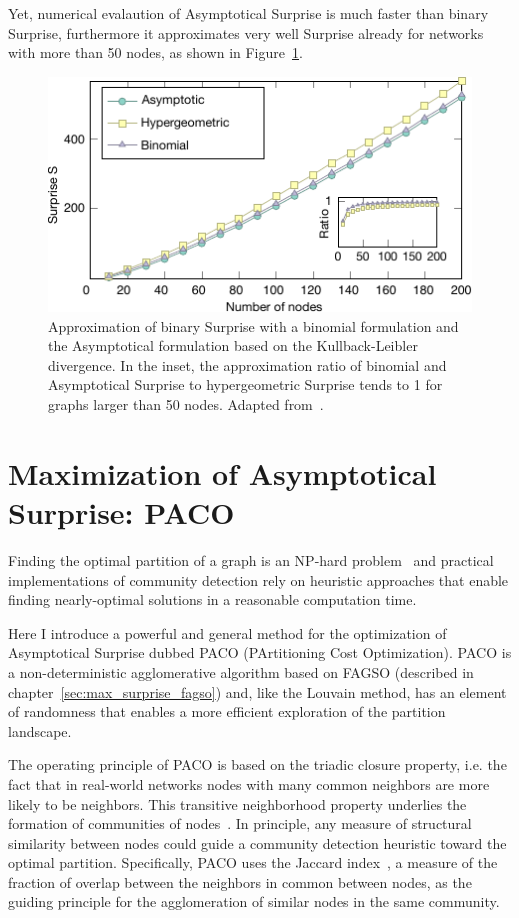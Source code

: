 Yet, numerical evalaution of Asymptotical Surprise is much faster than binary Surprise, furthermore it approximates very well Surprise already for networks with more than 50 nodes, as shown in Figure~\ref{fig:asymptotical_surprise_comparison}.

\begin{figure}[htb!]
\centering
\includegraphics[width=1\textwidth]{images/asymptotical_surprise_comparison.pdf}
\caption{Approximation of binary Surprise with a binomial formulation and the Asymptotical formulation based on the Kullback-Leibler divergence. In the inset, the approximation ratio of binomial and Asymptotical Surprise to hypergeometric Surprise tends to 1 for graphs larger than 50 nodes. Adapted from~\cite{traag2015}.}
\label{fig:asymptotical_surprise_comparison}
\end{figure}

\section{Maximization of Asymptotical Surprise: PACO}
Finding the optimal partition of a graph is an NP-hard problem~\cite{fortunato2010} and practical implementations of community detection rely on heuristic approaches that enable finding nearly-optimal solutions in a reasonable computation time.

Here I introduce a powerful and general method for the optimization of Asymptotical Surprise dubbed PACO (PArtitioning Cost Optimization).
PACO is a non-deterministic agglomerative algorithm based on FAGSO (described in chapter~\ref{sec:max_surprise_fagso}) and, like the Louvain method, has an element of randomness that enables a more efficient exploration of the partition landscape.

The operating principle of PACO is based on the triadic closure property, i.e. the fact that in real-world networks nodes with many common neighbors are more likely to be neighbors.
This transitive neighborhood property underlies the formation of communities of nodes~\cite{bianconi2014,eustace2015}.
In principle, any measure of structural similarity between nodes could guide a community detection heuristic toward the optimal partition.
Specifically, PACO uses the Jaccard index~\cite{jaccard1901}, a measure of the fraction of overlap between the neighbors in common between nodes, as the guiding principle for the agglomeration of similar nodes in the same community.

